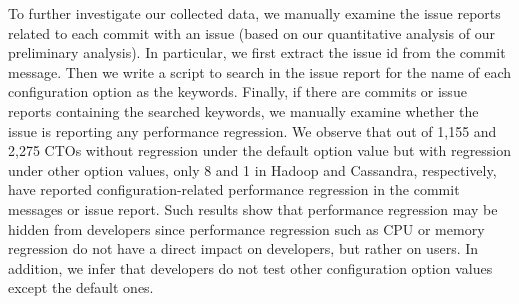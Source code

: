 To further investigate our collected data, we manually examine the issue reports related to each commit with an \inconsistent issue (based on our quantitative analysis of our preliminary analysis). In particular, we first extract the issue id from the commit message. Then we write a script to search in the issue report for the name of each configuration option as the keywords. Finally, if there are commits or issue reports containing the searched keywords, we manually examine whether the issue is reporting any performance regression.
We observe that out of 1,155 and 2,275 CTOs without regression under the default option value but with regression under other option values, only 8 and 1 \instance in Hadoop and Cassandra, respectively, have  reported configuration-related performance regression in the commit messages or issue report. Such results show that performance regression may be hidden from developers since performance regression such as CPU or memory regression do not have a direct impact on developers, but rather on users. In addition, we infer that developers do not test other configuration option values except the default ones.
